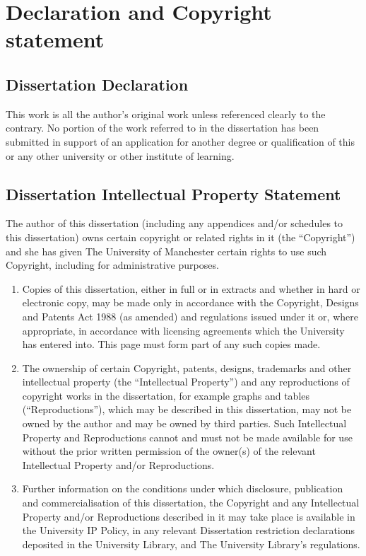 \documentclass[
]{article}
\begin{document}
\newpage

\section{Declaration and Copyright
statement}\label{declaration-and-copyright-statement}

\subsection{Dissertation Declaration}\label{dissertation-declaration}

This work is all the author's original work unless referenced clearly to
the contrary. No portion of the work referred to in the dissertation has
been submitted in support of an application for another degree or
qualification of this or any other university or other institute of
learning.

\subsection{Dissertation Intellectual Property
Statement}\label{dissertation-intellectual-property-statement}

The author of this dissertation (including any appendices and/or
schedules to this dissertation) owns certain copyright or related rights
in it (the ``Copyright'') and she has given The University of Manchester
certain rights to use such Copyright, including for administrative
purposes.

\begin{enumerate}
\def\labelenumi{\roman{enumi}.}
\item
  Copies of this dissertation, either in full or in extracts and whether
  in hard or electronic copy, may be made only in accordance with the
  Copyright, Designs and Patents Act 1988 (as amended) and regulations
  issued under it or, where appropriate, in accordance with licensing
  agreements which the University has entered into. This page must form
  part of any such copies made.
\item
  The ownership of certain Copyright, patents, designs, trademarks and
  other intellectual property (the ``Intellectual Property'') and any
  reproductions of copyright works in the dissertation, for example
  graphs and tables (``Reproductions''), which may be described in this
  dissertation, may not be owned by the author and may be owned by third
  parties. Such Intellectual Property and Reproductions cannot and must
  not be made available for use without the prior written permission of
  the owner(s) of the relevant Intellectual Property and/or
  Reproductions.
\item
  Further information on the conditions under which disclosure,
  publication and commercialisation of this dissertation, the Copyright
  and any Intellectual Property and/or Reproductions described in it may
  take place is available in the University IP Policy, in any relevant
  Dissertation restriction declarations deposited in the University
  Library, and The University Library's regulations.
\end{enumerate}
\end{document}
